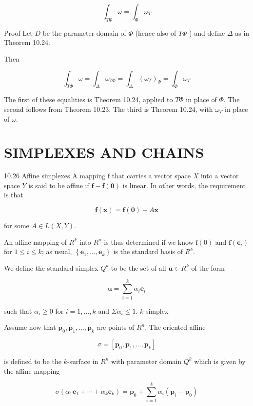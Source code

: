 \documentclass[10pt]{article}
\begin{document}
$$
\int_{T \Phi} \omega=\int_{\Phi} \omega_{T}
$$

Proof Let $D$ be the parameter domain of $\Phi$ (hence also of $T \Phi$ ) and define $\Delta$ as in Theorem 10.24.

Then

$$
\int_{T \Phi} \omega=\int_{\Delta} \omega_{T \Phi}=\int_{\Delta}\left(\omega_{T}\right)_{\Phi}=\int_{\Phi} \omega_{T}
$$

The first of these equalities is Theorem 10.24, applied to $T \Phi$ in place of $\Phi$. The second follows from Theorem 10.23. The third is Theorem 10.24, with $\omega_{T}$ in place of $\omega$.

\section{SIMPLEXES AND CHAINS}
10.26 Affine simplexes A mapping $\mathrm{f}$ that carries a vector space $X$ into a vector space $Y$ is said to be affine if $\mathbf{f}-\mathbf{f}(\mathbf{0})$ is linear. In other words, the requirement is that

$$
\mathbf{f}(\mathbf{x})=\mathbf{f}(\mathbf{0})+A \mathbf{x}
$$

for some $A \in L(X, Y)$.

An affine mapping of $R^{k}$ into $R^{n}$ is thus determined if we know $\mathrm{f}(0)$ and $\mathbf{f}\left(\mathbf{e}_{i}\right)$ for $1 \leq i \leq k$; as usual, $\left\{\mathbf{e}_{1}, \ldots, \mathbf{e}_{k}\right\}$ is the standard basis of $R^{k}$.

We define the standard simplex $Q^{k}$ to be the set of all $\mathbf{u} \in R^{k}$ of the form

$$
\mathbf{u}=\sum_{i=1}^{k} \alpha_{i} \mathbf{e}_{i}
$$

such that $\alpha_{i} \geq 0$ for $i=1, \ldots, k$ and $\Sigma \alpha_{i} \leq 1$. $k$-simplex

Assume now that $\mathbf{p}_{0}, \mathbf{p}_{1}, \ldots, \mathbf{p}_{k}$ are points of $R^{n}$. The oriented affine

$$
\sigma=\left[\mathbf{p}_{0}, \mathbf{p}_{1}, \ldots, \mathbf{p}_{k}\right]
$$

is defined to be the $k$-surface in $R^{n}$ with parameter domain $Q^{k}$ which is given by the affine mapping

$$
\sigma\left(\alpha_{1} \mathbf{e}_{1}+\cdots+\alpha_{k} \mathbf{e}_{k}\right)=\mathbf{p}_{0}+\sum_{i=1}^{k} \alpha_{i}\left(\mathbf{p}_{i}-\mathbf{p}_{0}\right)
$$
\end{document}
